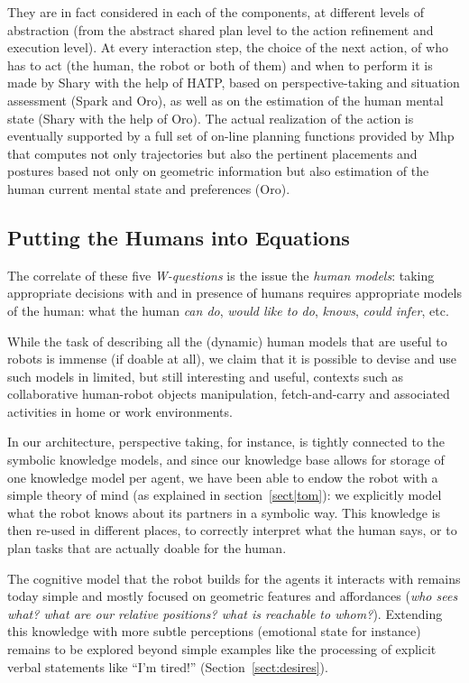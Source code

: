 \documentclass[preprint,3p,times]{elsarticle}
\begin{document}
They are in fact considered in each of the components, at different levels of
abstraction (from the abstract shared plan level to the action refinement and
execution level).  At every interaction step, the choice of the next action, of
who has to act (the human, the robot or both of them) and when to perform it is
made by {\sc Shary} with the help of HATP, based on perspective-taking and
situation assessment ({\sc Spark} and {\sc Oro}), as well as on the estimation of the
human mental state ({\sc Shary} with the help of {\sc Oro}). The actual
realization of the action is eventually supported by a full set of on-line
planning functions provided by {\sc Mhp} that computes not only trajectories but
also the pertinent placements and postures based not only on geometric
information but also estimation of the human current mental state and
preferences ({\sc Oro}).

\subsection{Putting the Humans into Equations}

The correlate of these five \emph{W-questions} is the issue the \emph{human
models}: taking appropriate decisions with and in presence of humans requires
appropriate models of the human: what the human \emph{can do}, \emph{would like
to do}, \emph{knows}, \emph{could infer}, etc.

While the task of describing all the (dynamic) human models that are useful to
robots is immense (if doable at all), we claim that it is possible to devise and
use such models in limited, but still interesting and useful, contexts such as
collaborative human-robot objects manipulation, fetch-and-carry and associated
activities in home or work environments.

In our architecture, perspective taking, for instance, is tightly connected to
the symbolic knowledge models, and since our knowledge base allows for storage
of one knowledge model per agent, we have been able to endow the robot with a
simple theory of mind (as explained in section~\ref{sect|tom}): we explicitly
model what the robot knows about its partners in a symbolic way. This knowledge
is then re-used in different places, to correctly interpret what the human says,
or to plan tasks that are actually doable for the human.

The cognitive model that the robot builds for the agents it interacts with
remains today simple and mostly focused on geometric features and affordances
(\emph{who sees what? what are our relative positions? what is reachable to
whom?}). Extending this knowledge with more subtle perceptions (emotional
state for instance) remains to be explored beyond simple examples like the
processing of explicit verbal statements like ``I'm tired!''
(Section~\ref{sect:desires}).
\end{document}
